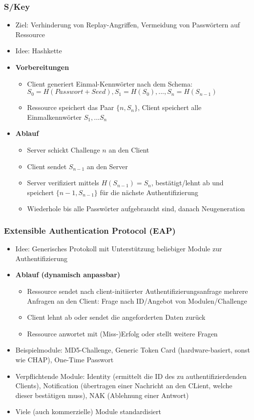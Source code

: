 \subsubsection{S/Key}
\begin{itemize}
	\item Ziel: Verhinderung von Replay-Angriffen, Vermeidung von Passwörtern auf Ressource
	\item Idee: Hashkette
	\item \textbf{Vorbereitungen}
	\begin{itemize}
		\item Client generiert Einmal-Kennwörter nach dem Schema: \(S_0=H(Passwort+Seed),S_1=H(S_0),...,S_n=H(S_{n-1})\)
		\item Ressource speichert das Paar \(\{n,S_n\}\), Client speichert alle Einmalkennwörter \(S_1,...S_n\)
	\end{itemize}
	\item \textbf{Ablauf}
	\begin{itemize}
		\item Server schickt Challenge \(n\) an den Client
		\item Client sendet \(S_{n-1}\) an den Server
		\item Server verifiziert mittels \(H(S_{n-1})=S_n\), bestätigt/lehnt ab und speichert \(\{n-1,S_{n-1}\}\) für die nächste Authentifizierung
		\item Wiederhole bis alle Passwörter aufgebraucht sind, danach Neugeneration
	\end{itemize}
\end{itemize}

\subsubsection{Extensible Authentication Protocol (EAP)}
\begin{itemize}
	\item Idee: Generisches Protokoll mit Unterstützung beliebiger Module zur Authentifizierung
	\item \textbf{Ablauf (dynamisch anpassbar)}
	\begin{itemize}
		\item Ressource sendet nach client-initiierter Authentifizierungsanfrage mehrere Anfragen an den Client: Frage nach ID/Angebot von Modulen/Challenge
		\item Client lehnt ab oder sendet die angeforderten Daten zurück
		\item Ressource anwortet mit (Miss-)Erfolg oder stellt weitere Fragen
	\end{itemize}
	\item Beispielmodule: MD5-Challenge, Generic Token Card (hardware-basiert, sonst wie CHAP), One-Time Passwort
	\item Verpflichtende Module: Identity (ermittelt die ID des zu authentifizierdenden Clients), Notification (übertragen einer Nachricht an den CLient, welche dieser bestätigen muss), NAK (Ablehnung einer Antwort)
	\item Viele (auch kommerzielle) Module standardisiert
\end{itemize}


